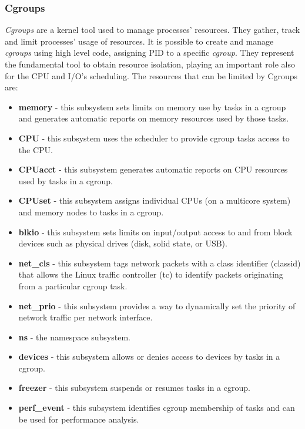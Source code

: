 \documentclass[a4paper,12pt]{article}
\begin{document}
\subsubsection{Cgroups}

\textit{Cgroups} are a kernel tool used to manage processes' resources. They
gather, track and limit processes' usage of resources. It is possible to create
and manage \textit{cgroups} using high level code, assigning PID to a specific
\textit{cgroup}. They represent the fundamental tool to obtain resource
isolation, playing an important role also for the CPU and I/O's scheduling. The
resources that can be limited by Cgroups
are\cite{red_hat_introduction_to_cgroups}:
\begin{itemize}
  \item \textbf{memory} - this subsystem sets limits on memory use by tasks in a
  cgroup and generates automatic reports on memory resources used by those
  tasks. 
  \item \textbf{CPU} - this subsystem uses the scheduler to provide cgroup tasks
  access to the CPU. 
  \item \textbf{CPUacct} - this subsystem generates automatic reports on CPU
  resources used by tasks in a cgroup. 
  \item \textbf{CPUset} - this subsystem assigns individual CPUs (on a multicore
  system) and memory nodes to tasks in a cgroup.
  \item \textbf{blkio} - this subsystem sets limits on input/output access to
  and from block devices such as physical drives (disk, solid state, or USB). 
  \item \textbf{net\_cls} - this subsystem tags network packets with a class
  identifier (classid) that allows the Linux traffic controller (tc) to identify
  packets originating from a particular cgroup task. 
  \item \textbf{net\_prio} - this subsystem provides a way to dynamically set
  the priority of network traffic per network interface. 
  \item \textbf{ns} - the namespace subsystem. 
  \item \textbf{devices} - this subsystem allows or denies access to devices by
  tasks in a cgroup. 
  \item \textbf{freezer} - this subsystem suspends or resumes tasks in a cgroup.
  \item \textbf{perf\_event} - this subsystem identifies cgroup membership of
  tasks and can be used for performance analysis. 
\end{itemize}   
\end{document}
